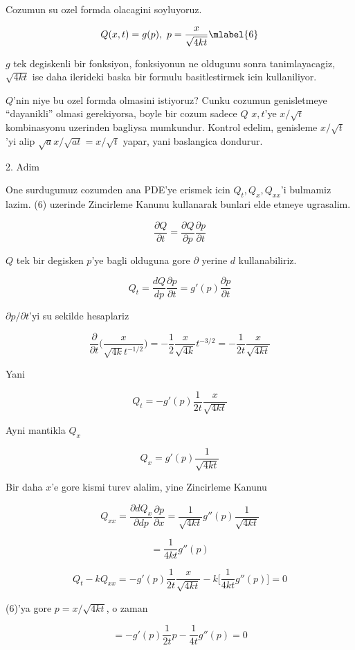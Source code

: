 \documentclass[12pt,fleqn]{article}\usepackage{../common}
\begin{document}
Cozumun su ozel formda olacagini soyluyoruz. 

\[ Q(x,t) = g(p), \ p = \frac{x}{\sqrt{4kt}} 
\mlabel{6} \]


$g$ tek degiskenli bir fonksiyon, fonksiyonun ne oldugunu sonra
tanimlayacagiz, $\sqrt{4kt}$ ise daha ilerideki baska bir formulu
basitlestirmek icin kullaniliyor. 

$Q$'nin niye bu ozel formda olmasini istiyoruz? Cunku cozumun genisletmeye
``dayanikli'' olmasi gerekiyorsa, boyle bir cozum sadece $Q$ $x,t$'ye
$x/\sqrt{t}$ kombinasyonu uzerinden bagliysa mumkundur. Kontrol edelim,
genisleme $x/\sqrt{t}$'yi alip $\sqrt{a}x/\sqrt{at} = x/\sqrt{t}$ yapar,
yani baslangica dondurur. 

2. Adim

One surdugumuz cozumden ana PDE'ye erismek icin $Q_t,Q_{x},Q_{xx}$'i
bulmamiz lazim. (6) uzerinde Zincirleme Kanunu kullanarak bunlari elde
etmeye ugrasalim. 

\[ \frac{\partial Q}{\partial t} = 
\frac{\partial Q}{\partial p}\frac{\partial p}{\partial t}
\]

$Q$ tek bir degisken $p$'ye bagli olduguna gore $\partial$ yerine $d$
kullanabiliriz. 

\[ Q_t = 
\frac{dQ}{dp}\frac{\partial p}{\partial t}  = 
g'(p)\frac{\partial p}{\partial t} 
\]

$\partial p/\partial t$'yi su sekilde hesaplariz

\[ 
\frac{\partial }{\partial t}
\bigg( 
\frac{x}{\sqrt{4k} t ^{-1/2}}
\bigg) = 
-\frac{1}{2} \frac{x}{\sqrt{4k}} t ^{-3/2} = 
-\frac{1}{2t} \frac{x}{\sqrt{4kt}}
 \]

Yani 

\[ Q_t = 
- g'(p)\frac{1}{2t} \frac{x}{\sqrt{4kt}}
\]

Ayni mantikla $Q_x$

\[ Q_x = g'(p)\frac{1}{\sqrt{4kt}} \]

Bir daha $x$'e gore kismi turev alalim, yine Zincirleme Kanunu 

\[ Q_{xx} = \frac{\partial dQ_x}{\partial dp}
\frac{\partial p}{\partial x} = 
\frac{1}{\sqrt{4kt}}g''(p)\frac{1}{\sqrt{4kt}} 
 \]

\[ = \frac{1}{4kt}g''(p) \]

\[ Q_t - kQ_{xx} = 
- g'(p)\frac{1}{2t} \frac{x}{\sqrt{4kt}} -
k\bigg[ 
 \frac{1}{4kt}g''(p) 
\bigg] = 0
 \]

(6)'ya gore $p = x/\sqrt{4kt}$, o zaman 

\[ =
- g'(p)\frac{1}{2t} p - \frac{1}{4t}g''(p)  = 0
 \]
\end{document}
